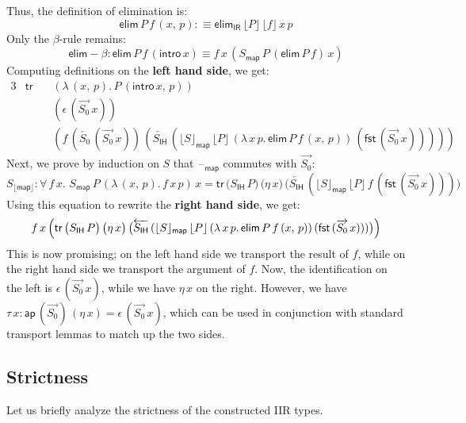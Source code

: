 \documentclass[acmsmall,screen,review,anonymous]{acmart}
\newcommand{\msf}[1]{{\mathsf{#1}}}
\newcommand{\blank}{{\mathord{\hspace{1pt}\text{--}\hspace{1pt}}}}
\newcommand{\IR}{\msf{IR}}
\newcommand{\intro}{\msf{intro}}
\newcommand{\IH}{\msf{IH}}
\newcommand{\map}{\msf{map}}
\newcommand{\elim}{\msf{elim}}
\newcommand{\tr}{\msf{tr}}
\newcommand{\fst}{\msf{fst}}
\newcommand{\floord}[1]{\lfloor #1 \rfloor}
\newcommand{\ora}[1]{\overrightarrow{#1}}
\newcommand{\ola}[1]{\overleftarrow{#1}}
\newcommand{\ap}{\msf{ap}}
\begin{document}
Thus, the definition of elimination is:
\[ \elim\,P\,f\,(x,\,p) :\equiv \elim_\IR\,\floord{P}\,\floord{f}\,x\,p \]
Only the $\beta$-rule remains:
\[ \elim\!-\!\!\beta : \elim\,P\,f\,(\intro\,x) \equiv f\,x\,(S_\map\,P\,(\elim\,P\,f)\,x) \]
Computing definitions on the \textbf{left hand side}, we get:
\begin{alignat*}{3}
  & \tr\, &&(\lambda\,(x,\,p).\,P\,(\intro\,x,\,p))\\
  &       &&(\epsilon\,(\ora{S_0}\,x))\\
  &       &&(f\,(\ola{S_0}\,(\ora{S_0}\,x))\,(\ola{S_\IH}\,(\floord{S}_\map\,\floord{P}\,(\lambda\,x\,p.\,\elim\,P\,f\,(x,\,p))\,(\fst\,(\ora{S_0}\,x)))))
\end{alignat*}
Next, we prove by induction on $S$ that $\blank_\map$ commutes with $\ora{S_0}$:
\[ S_{\floord{\map}} : \forall\,f\,x.\,\,S_\map\,P\,(\lambda\,(x,\,p).\,f\,x\,p)\,x = \tr\,\bigl(S_\IH\,P\bigr)\,\bigl(\eta\,x\bigr)\,\bigl(\ola{S_\IH}\,(\floord{S}_\map\,\floord{P}\,f\,(\fst\,(\ora{S_0}\,x)))\bigr)\]
Using this equation to rewrite the \textbf{right hand side}, we get:
\begin{alignat*}{3}
  f\,x\,\Bigl(\tr\,\bigl(S_\IH\,P\bigr)\,\bigl(\eta\,x\bigr)\,\bigl(\ola{S_\IH}\,(\floord{S}_\map\,\floord{P}\,(\lambda\,x\,p.\,\elim\,P\,f\,(x,\,p))\,(\fst\,(\ora{S_0}\,x)))\bigr)\Bigr)
\end{alignat*}
This is now promising; on the left hand side we transport the result of $f$, while on the right hand
side we transport the argument of $f$. Now, the identification on the left is
$\epsilon\,(\ora{S_0}\,x)$, while we have $\eta\,x$ on the right. However, we have $\tau\,x :
\ap\,(\ora{S_0})\,(\eta\,x) = \epsilon\,(\ora{S_0}\,x)$, which can be used in conjunction with
standard transport lemmas to match up the two sides.

\subsection{Strictness}
Let us briefly analyze the strictness of the constructed IIR types.





\end{document}
